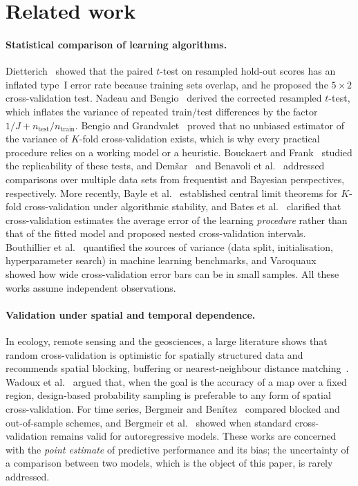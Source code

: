 \section{Related work}\label{sec:related}

\paragraph{Statistical comparison of learning algorithms.}
Dietterich~\cite{dietterich1998} showed that the paired $t$-test on resampled hold-out scores has an inflated type~I error rate because training sets overlap, and he proposed the $5\times2$ cross-validation test. Nadeau and Bengio~\cite{nadeau2003} derived the corrected resampled $t$-test, which inflates the variance of repeated train/test differences by the factor $1/J + n_{\text{test}}/n_{\text{train}}$. Bengio and Grandvalet~\cite{bengio2004} proved that no unbiased estimator of the variance of $K$-fold cross-validation exists, which is why every practical procedure relies on a working model or a heuristic. Bouckaert and Frank~\cite{bouckaert2004} studied the replicability of these tests, and Dem\v{s}ar~\cite{demsar2006} and Benavoli et al.~\cite{benavoli2017} addressed comparisons over multiple data sets from frequentist and Bayesian perspectives, respectively. More recently, Bayle et al.~\cite{bayle2020} established central limit theorems for $K$-fold cross-validation under algorithmic stability, and Bates et al.~\cite{bates2024} clarified that cross-validation estimates the average error of the learning \emph{procedure} rather than that of the fitted model and proposed nested cross-validation intervals. Bouthillier et al.~\cite{bouthillier2021} quantified the sources of variance (data split, initialisation, hyperparameter search) in machine learning benchmarks, and Varoquaux~\cite{varoquaux2018} showed how wide cross-validation error bars can be in small samples. All these works assume independent observations.

\paragraph{Validation under spatial and temporal dependence.}
In ecology, remote sensing and the geosciences, a large literature shows that random cross-validation is optimistic for spatially structured data and recommends spatial blocking, buffering or nearest-neighbour distance matching~\cite{roberts2017,valavi2019,lerest2014,meyer2018,ploton2020,schratz2019,linnenbrink2024}. Wadoux et al.~\cite{wadoux2021} argued that, when the goal is the accuracy of a map over a fixed region, design-based probability sampling is preferable to any form of spatial cross-validation. For time series, Bergmeir and Ben\'{i}tez~\cite{bergmeir2012} compared blocked and out-of-sample schemes, and Bergmeir et al.~\cite{bergmeir2018} showed when standard cross-validation remains valid for autoregressive models. These works are concerned with the \emph{point estimate} of predictive performance and its bias; the uncertainty of a comparison between two models, which is the object of this paper, is rarely addressed.

